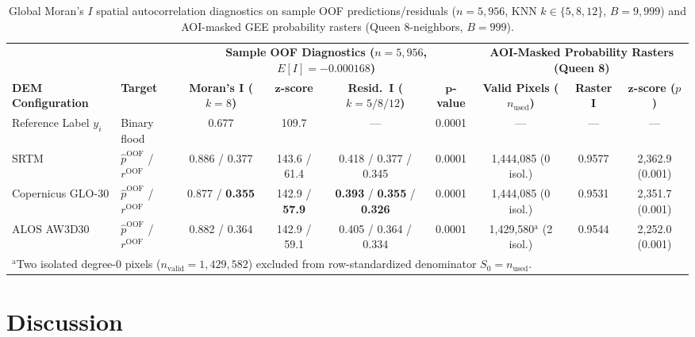 \documentclass[11pt,twoside]{article}
\begin{document}
\begin{table}[!htbp]
\small
\centering
\caption{Global Moran's $I$ spatial autocorrelation diagnostics on sample OOF predictions/residuals ($n = 5{,}956$, KNN $k \in \{5,8,12\}$, $B = 9{,}999$) and AOI-masked GEE probability rasters (Queen 8-neighbors, $B = 999$).}
\label{tab:moran-diagnostics}
\begin{adjustbox}{max width=\textwidth}
\begin{tabular}{ll cccc ccc}
\toprule
& & \multicolumn{4}{c}{\textbf{Sample OOF Diagnostics ($n = 5{,}956$, $E[I]=-0.000168$)}} & \multicolumn{3}{c}{\textbf{AOI-Masked Probability Rasters (Queen 8)}} \\
\cmidrule(lr){3-6} \cmidrule(lr){7-9}
\textbf{DEM Configuration} & \textbf{Target} & \textbf{Moran's $\boldsymbol{I}$ ($k=8$)} & $\boldsymbol{z}$\textbf{-score} & \textbf{Resid.\ $\boldsymbol{I}$ ($k=5 / 8 / 12$)} & $\boldsymbol{p}$\textbf{-value} & \textbf{Valid Pixels ($n_{\text{used}}$)} & \textbf{Raster $\boldsymbol{I}$} & $\boldsymbol{z}$\textbf{-score ($p$)} \\
\midrule
Reference Label $y_i$ & Binary flood & 0.677 & 109.7 & --- & 0.0001 & --- & --- & --- \\
SRTM & $\hat{p}^{\text{OOF}}$ / $r^{\text{OOF}}$ & 0.886 / 0.377 & 143.6 / 61.4 & 0.418 / 0.377 / 0.345 & 0.0001 & 1,444,085 (0 isol.) & 0.9577 & 2,362.9 (0.001) \\
Copernicus GLO-30 & $\hat{p}^{\text{OOF}}$ / $r^{\text{OOF}}$ & 0.877 / \textbf{0.355} & 142.9 / \textbf{57.9} & \textbf{0.393} / \textbf{0.355} / \textbf{0.326} & 0.0001 & 1,444,085 (0 isol.) & 0.9531 & 2,351.7 (0.001) \\
ALOS AW3D30 & $\hat{p}^{\text{OOF}}$ / $r^{\text{OOF}}$ & 0.882 / 0.364 & 142.9 / 59.1 & 0.405 / 0.364 / 0.334 & 0.0001 & 1,429,580$^{\text{a}}$ (2 isol.) & 0.9544 & 2,252.0 (0.001) \\
\bottomrule
\multicolumn{9}{l}{\scriptsize $^{\text{a}}$Two isolated degree-0 pixels ($n_{\text{valid}} = 1{,}429{,}582$) excluded from row-standardized denominator $S_0 = n_{\text{used}}$.}
\end{tabular}
\end{adjustbox}
\end{table}

\FloatBarrier

\section{Discussion}\label{sec:discussion}
\end{document}
